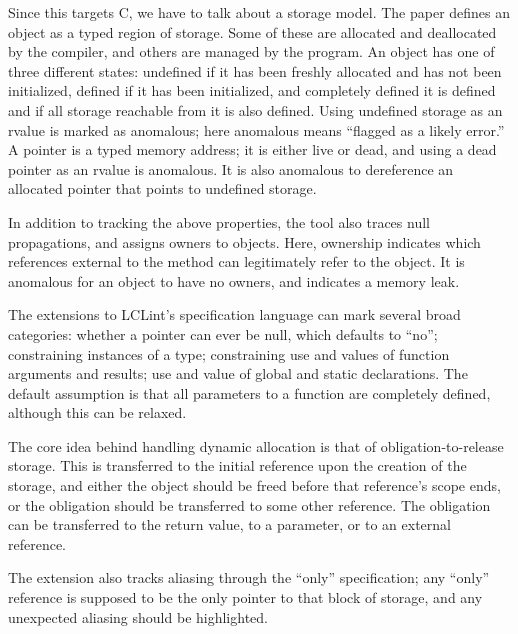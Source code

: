 \documentclass{article}
\begin{document}
\begin{multicols}{2}
Since this targets C, we have to talk about a storage model.  The
paper defines an object as a typed region of storage.  Some of these
are allocated and deallocated by the compiler, and others are managed
by the program.  An object has one of three different states:
undefined if it has been freshly allocated and has not been
initialized, defined if it has been initialized, and completely
defined it is defined and if all storage reachable from it is also
defined.  Using undefined storage as an rvalue is marked as anomalous;
here anomalous means ``flagged as a likely error.''  A pointer is a
typed memory address; it is either live or dead, and using a dead
pointer as an rvalue is anomalous.  It is also anomalous to
dereference an allocated pointer that points to undefined storage.

In addition to tracking the above properties, the tool also traces
null propagations, and assigns owners to objects.  Here, ownership
indicates which references external to the method can legitimately
refer to the object.  It is anomalous for an object to have no owners,
and indicates a memory leak.

The extensions to LCLint's specification language can mark several
broad categories: whether a pointer can ever be null, which defaults
to ``no''; constraining instances of a type; constraining use and
values of function arguments and results; use and value of global and
static declarations.  The default assumption is that all parameters to
a function are completely defined, although this can be relaxed.

The core idea behind handling dynamic allocation is that of
obligation-to-release storage.  This is transferred to the initial
reference upon the creation of the storage, and either the object
should be freed before that reference's scope ends, or the obligation
should be transferred to some other reference.  The obligation can be
transferred to the return value, to a parameter, or to an external
reference.

The extension also tracks aliasing through the ``only'' specification;
any ``only'' reference is supposed to be the only pointer to that
block of storage, and any unexpected aliasing should be highlighted.


\end{multicols}
\end{document}
